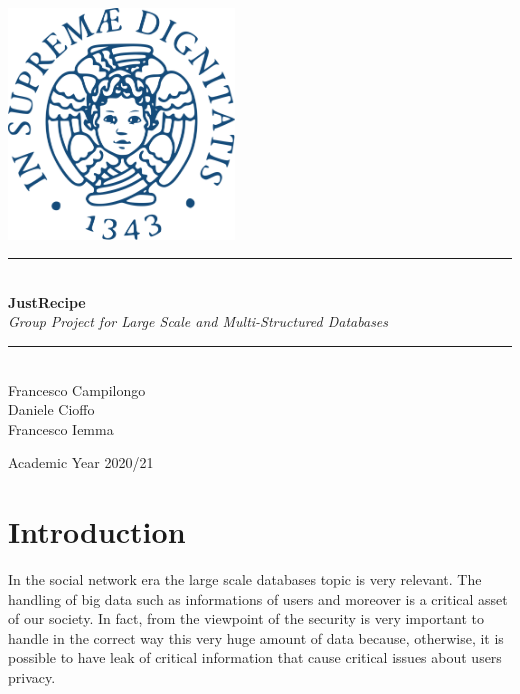 \documentclass[a4paper]{report}
\newcommand{\HRule}{\rule{\linewidth}{0.5mm}}
\begin{document}
\begin{titlepage}
	\begin{center}
		
		\includegraphics[width=0.45\textwidth]{img/unipi.png}~\\[2.5cm]
		
		
		\HRule \\[0.4cm]
		{ \LARGE 
			\textbf{JustRecipe}\\[0.4cm]
			\emph{Group Project for Large Scale and Multi-Structured Databases}\\[0.4cm]
		}
		\HRule \\[1.5cm]
		
		
		
		{ \large
			Francesco Campilongo \\[0.1cm]
			Daniele Cioffo \\[0.1cm]
			Francesco Iemma \\[0.1cm]
		}
		
		\vfill

		
		
		{\large Academic Year 2020/21}
		
	\end{center}
\end{titlepage}


\tableofcontents

\chapter*{Introduction}
In the social network era the large scale databases topic is very relevant. The handling of big data such as informations of users and moreover is a critical asset of our society. In fact, from the viewpoint of the security is very important to handle in the correct way this very huge amount of data because, otherwise, it is possible to have leak of critical information that cause critical issues about users privacy.
\end{document}
